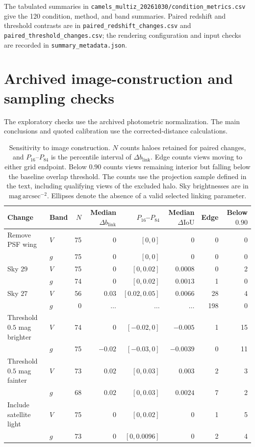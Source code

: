 \documentclass[usenatbib]{mnras}
\begin{document}
The tabulated summaries in
\texttt{camels\_multiz\_20261030/condition\_metrics.csv} give the 120
condition, method, and band summaries. Paired redshift and threshold
contrasts are in \texttt{paired\_redshift\_changes.csv} and
\texttt{paired\_threshold\_changes.csv}; the rendering configuration and
input checks are recorded in \texttt{summary\_metadata.json}.

\section{Archived image-construction and sampling checks}
The exploratory checks use the archived photometric normalization. The main
conclusions and quoted calibration use the corrected-distance calculations.
\begin{table}
\centering
\caption{Sensitivity to image construction.
$N$ counts haloes retained for paired changes, and $P_{16}$--$P_{84}$
is the percentile interval of $\Delta b_{\mathrm{link}}$.
Edge counts views moving to either grid endpoint.
Below $0.90$ counts views remaining interior but falling below the
baseline overlap threshold.
The counts use the projection sample defined in the text, including qualifying
views of the excluded halo.
Sky brightnesses are in $\mathrm{mag\,arcsec}^{-2}$.
Ellipses denote the absence of a valid selected linking parameter.}
\label{tab:imagingvariants}
\small
\setlength{\tabcolsep}{5pt}
\begin{tabular}{llrrrrrr}
\toprule
Change & Band & $N$ & Median $\Delta b_{\mathrm{link}}$ & $P_{16}$--$P_{84}$
& Median $\Delta\mathrm{IoU}$ & Edge & Below $0.90$ \\
\midrule
Remove PSF wing & $V$ & 75 & $0$ & $[0,0]$ & $0$ & 0 & 0 \\
 & $g$ & 75 & $0$ & $[0,0]$ & $0$ & 0 & 0 \\
Sky $29$ & $V$ & 75 & $0$ & $[0,0.02]$ & $0.0008$ & 0 & 2 \\
 & $g$ & 74 & $0$ & $[0,0.02]$ & $0.0013$ & 1 & 0 \\
Sky $27$ & $V$ & 56 & $0.03$ & $[0.02,0.05]$ & $0.0066$ & 28 & 4 \\
 & $g$ & 0 & $\ldots$ & $\ldots$ & $\ldots$ & 198 & 0 \\
Threshold $0.5$ mag brighter & $V$ & 74 & $0$ & $[-0.02,0]$ & $-0.005$ & 1 & 15 \\
 & $g$ & 75 & $-0.02$ & $[-0.03,0]$ & $-0.0039$ & 0 & 11 \\
Threshold $0.5$ mag fainter & $V$ & 73 & $0.02$ & $[0,0.03]$ & $0.003$ & 2 & 3 \\
 & $g$ & 68 & $0.02$ & $[0,0.03]$ & $0.0024$ & 7 & 2 \\
Include satellite light & $V$ & 75 & $0$ & $[0,0.02]$ & $0$ & 1 & 5 \\
 & $g$ & 73 & $0$ & $[0,0.0096]$ & $0$ & 2 & 4 \\
\bottomrule
\end{tabular}
\end{table}
\end{document}
